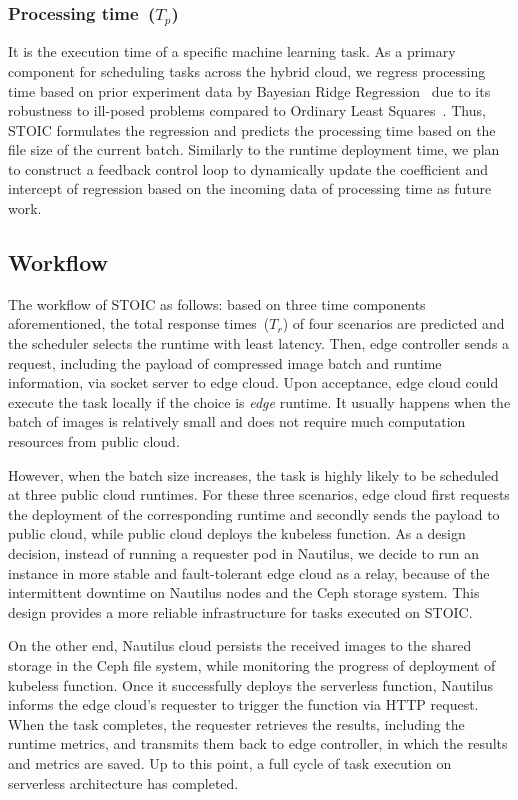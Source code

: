  \subsubsection{Processing time~($T_p$)} It is the execution time of a specific machine learning task. As a primary component for scheduling tasks across the hybrid cloud, we regress processing time based on prior experiment data by Bayesian Ridge Regression~\cite{ref:brr} due to its robustness to ill-posed problems compared to Ordinary Least Squares~\cite{ref:ols}. Thus, STOIC formulates the regression and predicts the processing time based on the file size of the current batch. Similarly to the runtime deployment time, we plan to construct a feedback control loop to dynamically update the coefficient and intercept of regression based on the incoming data of processing time as future work.
 
 \subsection{Workflow}
 The workflow of STOIC as follows: based on three time components aforementioned, the total response times~($T_r$) of four scenarios are predicted and the scheduler selects the runtime with least latency. Then, edge controller sends a request, including the payload of compressed image batch and runtime information, via socket server to edge cloud. Upon acceptance, edge cloud could execute the task locally if the choice is \textit{edge} runtime. It usually happens when the batch of images is relatively small and does not require much computation resources from public cloud.
 
 However, when the batch size increases, the task is highly likely to be scheduled at three public cloud runtimes. For these three scenarios, edge cloud first requests the deployment of the corresponding runtime and secondly sends the payload to public cloud, while public cloud deploys the kubeless function. As a design decision, instead of running a requester pod in Nautilus, we decide to run an instance in more stable and fault-tolerant edge cloud as a relay, because of the intermittent downtime on Nautilus nodes and the Ceph storage system. This design provides a more reliable infrastructure for tasks executed on STOIC.
 
 On the other end, Nautilus cloud persists the received images to the shared storage in the Ceph file system, while monitoring the progress of deployment of kubeless function. Once it successfully deploys the serverless function, Nautilus informs the edge cloud's requester to trigger the function via HTTP request. When the task completes, the requester retrieves the results, including the runtime metrics, and transmits them back to edge controller, in which the results and metrics are saved. Up to this point, a full cycle of task execution on serverless architecture has completed.
 
